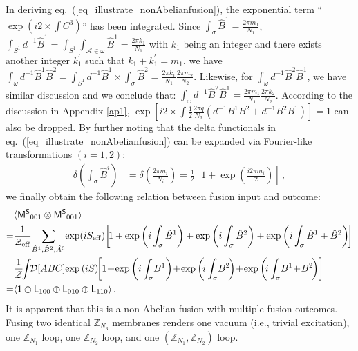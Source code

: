 \documentclass[11pt,nofootinbib,preprint]{revtex4-1}
\begin{document}
In deriving eq.~(\ref{eq_illustrate_nonAbelianfusion}), the exponential term ``$\exp\left(i2\times\int C^3\right)$'' has been integrated. Since $\int_{\sigma}{\hat{B}^1}=\frac{2\pi m_1}{N_1}$, $\int_{S^1}{d^{-1}\hat{B}^1}=\int_{S^1}{\int_{\mathcal{A} \in \omega}{\hat{B}^1}}=\frac{2\pi k_1}{N_1}$ with $k_1$ being an integer and there exists another integer $k_{1}^{\prime}$ such that $k_1+k_{1}^{\prime}=m_1$, we have 
$	\int_{\omega}{d^{-1}\hat{B}^1\hat{B}^2}=\int_{S^1}{d^{-1}\hat{B}^1}\times \int_{\sigma}{\hat{B}^2}=\frac{2\pi k_1}{N_1}\frac{2\pi m_2}{N_2}
 $. Likewise, for $\int_{\omega}{d^{-1}\hat{B}^2\hat{B}^1}$, we have similar discussion and we conclude that:
 $
	\int_{\omega}{d^{-1}\hat{B}^2\hat{B}^1}=\frac{2\pi m_1}{N_1}\frac{2\pi k_2}{N_2}
 $. According to the discussion in Appendix \ref{ap1},     $\exp \left[ i2\times \int \frac{1}{2}\frac{2\pi q}{N_3}\left( d^{-1}B^1B^2+d^{-1}B^2B^1 \right) \right] =1$ can also be dropped.
 By further noting that the delta functionals in eq.~(\ref{eq_illustrate_nonAbelianfusion}) can be expanded via Fourier-like transformations $(i=1,2)$:
\begin{align}
	\delta \left( \int_{\sigma}{\hat{B}^i} \right) &=\delta \left( \frac{2\pi m_i}{N_i} \right) =\frac{1}{2}\left[ 1+\exp \left( \frac{i2\pi m_i}{2} \right) \right] \,,
\end{align}
we finally    obtain the following relation between fusion input and outcome:
\begin{align}
	&\langle \mathsf{M^S}_{001}\otimes \mathsf{M^S}_{001} \rangle \nonumber\\
	=& \frac{1}{\mathcal{Z}_{\rm eff}}  \!  \sum_{\hat{B}^1,\hat{B}^2,\hat{A}^3} \! \exp \! \left( iS_{\rm eff}\right) \! 
\left[\!  1+\exp \left( i\int_{\sigma}{\hat{B}^1} \right) +\exp \left( i\int_{\sigma}{\hat{B}^2} \right) +\exp \left( i\int_{\sigma}{\hat{B}^1+\hat{B}^2} \right) \! \right] \nonumber
	\\
\!\!=& \frac{1}{\mathcal{Z}}\!\!\int\!\! \mathcal{D} \!\left[ ABC \right]\!\exp \left( iS \right) \!\!
\left[ 1\!+\!\exp \left( i\int_{\sigma}\!{ {B}^1} \right) \!+\!\exp \left(\! i\int_{\sigma}\!{ {B}^2} \!\right) \!+\!\exp \left(\! i\int_{\sigma}\!{ {B}^1\!+\! {B}^2} \!\right) \right] \nonumber
	\\
	=&\langle \mathsf{1}\oplus \mathsf{L}_{100}\oplus \mathsf{L}_{010}\oplus \mathsf{L}_{110} \rangle	\label{equation_Ms001Ms001}\,.
\end{align}
It is apparent that this is a non-Abelian fusion with multiple fusion outcomes. Fusing two identical $\mathbb{Z} _{N_3}$ membranes renders   one  vacuum (i.e., trivial excitation), one $\mathbb{Z} _{N_1}$ loop, one $\mathbb{Z} _{N_2}$ loop, and one $ \left( \mathbb{Z} _{N_1},\mathbb{Z} _{N_2} \right) $ loop. 
\end{document}
